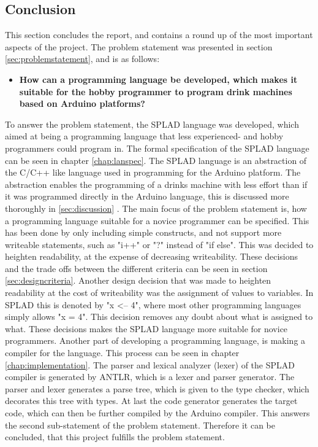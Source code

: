 \subsection{Conclusion}
This section concludes the report, and contains a round up of the most important aspects of the project.
The problem statement was presented in section \ref{sec:problemstatement}, and is as follows: 
\begin{itemize}
	\item \textbf{How can a programming language be developed, which makes it suitable for the hobby programmer to program drink machines based on Arduino platforms?}
\end{itemize}

To answer the problem statement, the SPLAD language was developed, which aimed at being a programming language that less experienced- and hobby programmers could program in. The formal specification of the SPLAD language can be seen in chapter \ref{chap:lanspec}. The SPLAD language is an abstraction of the C/C++ like language used in programming for the Arduino platform. The abstraction enables the programming of a drinks machine with less effort than if it was programmed directly in the Arduino language, this is discussed more thoroughly in \ref{sec:discussion} . The main focus of the problem statement is, how a programming language suitable for a novice programmer can be specified. This has been done by only including simple constructs, and not support more writeable statements, such as "i++" or "?" instead of "if else". This was decided to heighten readability, at the expense of decreasing writeability. These decisions and the trade offs between the different criteria can be seen in section \ref{sec:designcriteria}. Another design decision that was made to heighten readability at the cost of writeability was the assignment of values to variables. In SPLAD this is denoted by "x <-- 4", where most other programming languages simply allows "x = 4". This decision removes any doubt about what is assigned to what. These decisions makes the SPLAD language more suitable for novice programmers.
Another part of developing a programming language, is making a compiler for the language. This process can be seen in chapter \ref{chap:implementation}. The parser and lexical analyzer (lexer) of the SPLAD compiler is generated by ANTLR, which is a lexer and parser generator. The parser and lexer generates a parse tree, which is given to the type checker, which decorates this tree with types. At last the code generator generates the target code, which can then be further compiled by the Arduino compiler. This answers the second sub-statement of the problem statement. Therefore it can be concluded, that this project fulfills the problem statement. 